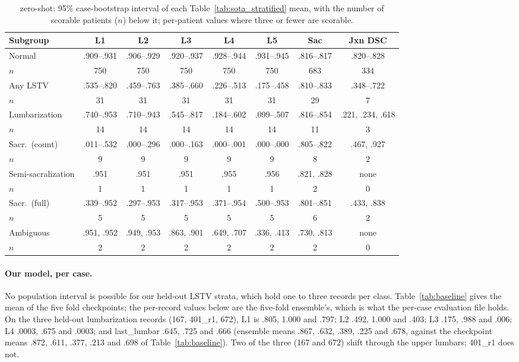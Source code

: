 \begin{table}[h]
\caption{\sota{} zero-shot: 95\% case-bootstrap interval
of each Table~\ref{tab:sota_stratified} mean, with the
number of scorable patients ($n$) below it; per-patient
values where three or fewer are scorable.}
\label{tab:ci}
\centering
\footnotesize
\setlength{\tabcolsep}{4pt}
\begin{tabular}{lccccccc}
\toprule
\bfseries Subgroup & \bfseries L1 & \bfseries L2 & \bfseries L3 & \bfseries L4 & \bfseries L5 & \bfseries Sac & \bfseries Jxn DSC \\
\midrule
Normal              & .909--.931 & .906--.929 & .920--.937 & .928--.944 & .931--.945 & .816--.817 & .820--.828 \\
\quad $n$           & 750 & 750 & 750 & 750 & 750 & 683 & 334 \\[2pt]
Any LSTV            & .535--.820 & .459--.763 & .385--.660 & .226--.513 & .175--.458 & .810--.833 & .348--.722 \\
\quad $n$           & 31 & 31 & 31 & 31 & 31 & 29 & 7 \\[2pt]
Lumbarization       & .740--.953 & .710--.943 & .545--.817 & .184--.602 & .099--.507 & .816--.854 & .221, .234, .618 \\
\quad $n$           & 14 & 14 & 14 & 14 & 14 & 11 & 3 \\[2pt]
Sacr.\ (count)      & .011--.532 & .000--.296 & .000--.163 & .000--.001 & .000--.000 & .805--.822 & .467, .927 \\
\quad $n$           & 9 & 9 & 9 & 9 & 9 & 8 & 2 \\[2pt]
Semi-sacralization  & .951 & .951 & .951 & .955 & .956 & .821, .828 & none \\
\quad $n$           & 1 & 1 & 1 & 1 & 1 & 2 & 0 \\[2pt]
Sacr.\ (full)       & .339--.952 & .297--.953 & .317--.953 & .371--.954 & .500--.953 & .801--.851 & .433, .838 \\
\quad $n$           & 5 & 5 & 5 & 5 & 5 & 6 & 2 \\[2pt]
Ambiguous           & .951, .952 & .949, .953 & .863, .901 & .649, .707 & .336, .413 & .730, .813 & none \\
\quad $n$           & 2 & 2 & 2 & 2 & 2 & 2 & 0 \\
\bottomrule
\end{tabular}
\end{table}

\paragraph{Our model, per case.}
No population interval is possible for our held-out LSTV
strata, which hold one to three records per class.
Table~\ref{tab:baseline} gives the mean of the five fold
checkpoints; the per-record values below are the five-fold
ensemble's, which is what the per-case evaluation file
holds. On the three held-out lumbarization records
(167, 401\_r1, 672), L1 is .805, 1.000 and .797; L2 .492,
1.000 and .403; L3 .175, .988 and .006; L4 .0003, .675 and
.0003; and last\_lumbar .645, .725 and .666 (ensemble means
.867, .632, .389, .225 and .678, against the checkpoint
means .872, .611, .377, .213 and .698 of
Table~\ref{tab:baseline}). Two of the three (167 and 672)
shift through the upper lumbars; 401\_r1 does not.
